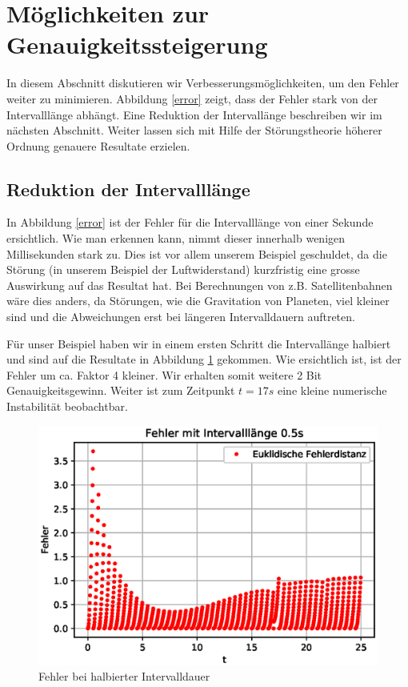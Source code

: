 \section{Möglichkeiten zur Genauigkeitssteigerung
\label{perturbation:section:weitereverbesserungen}}
In diesem Abschnitt diskutieren wir Verbesserungsmöglichkeiten, um den Fehler weiter zu minimieren. 
Abbildung \ref{error} zeigt, dass der Fehler stark von der Intervalllänge abhängt. 
Eine Reduktion der Intervallänge beschreiben wir im nächsten Abschnitt. Weiter lassen sich mit Hilfe der Störungstheorie höherer Ordnung genauere Resultate erzielen.

\subsection{Reduktion der Intervalllänge}
In Abbildung \ref{error} ist der Fehler für die Intervalllänge von einer Sekunde ersichtlich. 
Wie man erkennen kann, nimmt dieser innerhalb wenigen Millisekunden stark zu. 
Dies ist vor allem unserem Beispiel geschuldet, da die Störung (in unserem Beispiel der Luftwiderstand) kurzfristig eine grosse Auswirkung auf das Resultat hat. 
Bei Berechnungen von z.B. Satellitenbahnen wäre dies anders, da Störungen, wie die Gravitation von Planeten, viel kleiner sind und die Abweichungen erst bei längeren Intervalldauern auftreten.

Für unser Beispiel haben wir in einem ersten Schritt die Intervallänge halbiert und sind auf die Resultate in Abbildung \ref{errorShortInterval} gekommen. 
Wie ersichtlich ist, ist der Fehler um ca. Faktor 4 kleiner. 
Wir erhalten somit weitere 2 Bit Genauigkeitsgewinn. 
Weiter ist zum Zeitpunkt $t=17s$ eine kleine numerische Instabilität beobachtbar.

\begin{figure}
    \centering
    \includegraphics[scale=0.7]{papers/perturbation/bilder/perturbation_fig4.eps}
    \caption{Fehler bei halbierter Intervalldauer}
	\label{errorShortInterval}
\end{figure}

